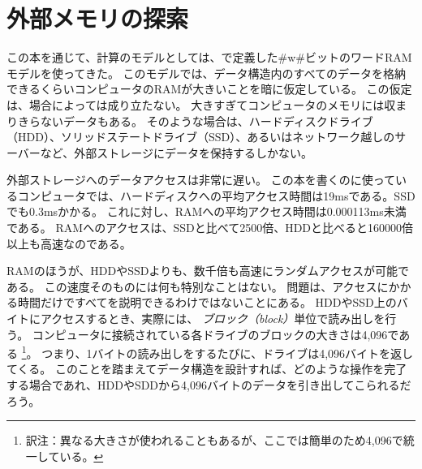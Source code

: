 \chapter{外部メモリの探索}
この本を通じて、計算のモデルとしては、で定義した#w#ビットのワードRAMモデルを使ってきた。
このモデルでは、データ構造内のすべてのデータを格納できるくらいコンピュータのRAMが大きいことを暗に仮定している。
この仮定は、場合によっては成り立たない。
大きすぎてコンピュータのメモリには収まりきらないデータもある。
そのような場合は、ハードディスクドライブ（HDD）、ソリッドステートドライブ（SSD）、あるいはネットワーク越しのサーバーなど、外部ストレージにデータを保持するしかない。

%
%
%
%
外部ストレージへのデータアクセスは非常に遅い。
この本を書くのに使っているコンピュータでは、ハードディスクへの平均アクセス時間は19msである。SSDでも0.3msかかる。
これに対し、RAMへの平均アクセス時間は0.000113ms未満である。
RAMへのアクセスは、SSDと比べて2500倍、HDDと比べると160000倍以上も高速なのである。

% 
% 

RAMのほうが、HDDやSSDよりも、数千倍も高速にランダムアクセスが可能である。
この速度そのものには何も特別なことはない。
問題は、アクセスにかかる時間だけですべてを説明できるわけではないことにある。
HDDやSSD上のバイトにアクセスするとき、実際には、
\emph{ブロック（block）}単位で読み出しを行う。
%
コンピュータに接続されている各ドライブのブロックの大きさは4,096である
\footnote{訳注：異なる大きさが使われることもあるが、ここでは簡単のため4,096で統一している。}。
つまり、1バイトの読み出しをするたびに、ドライブは4,096バイトを返してくる。
このことを踏まえてデータ構造を設計すれば、どのような操作を完了する場合であれ、HDDやSDDから4,096バイトのデータを引き出してこられるだろう。


